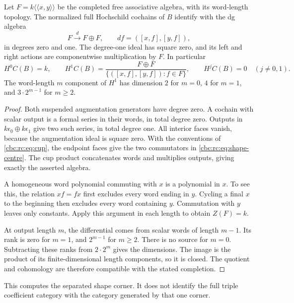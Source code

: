 \begin{theorem}\label{cbc:rc:thm:shape-centre}
Let \(F=k\langle\!\langle x,y\rangle\!\rangle\) be the completed free
associative algebra, with its word-length topology.
The normalized full Hochschild cochains of \(B\) identify with the dg
algebra
\begin{equation}\label{cbc:rc:eq:shape-centre}
 F\xrightarrow{d}F\oplus F,\qquad
 df=([x,f],[y,f]),
\end{equation}
in degrees zero and one.  The degree-one ideal has square zero, and
its left and right actions are componentwise multiplication by \(F\).
In particular
\[
 H^0C(B)=k,\qquad
 H^1C(B)=\frac{F\oplus F}
 {\{([x,f],[y,f]):f\in F\}},
 \qquad H^jC(B)=0\quad(j\ne0,1).
\]
The word-length \(m\) component of \(H^1\) has dimension
\(2\) for \(m=0\), \(4\) for \(m=1\), and
\(3\cdot2^{m-1}\) for \(m\geq2\).
\end{theorem}
\begin{proof}
Both suspended augmentation generators have degree zero.  A cochain
with scalar output is a formal series in their words, in total degree
zero.  Outputs in \(k\epsilon_0\oplus k\epsilon_1\) give two such
series, in total degree one.  All interior faces vanish, because the
augmentation ideal is square zero.  With the conventions of
\eqref{cbc:rc:eq:cup}, the endpoint faces give the two commutators in
\eqref{cbc:rc:eq:shape-centre}.  The cup product concatenates words and
multiplies outputs, giving exactly the asserted algebra.

A homogeneous word polynomial commuting with \(x\) is a polynomial
in \(x\).  To see this, the relation \(xf=fx\) first excludes every
word ending in \(y\). Cycling a final \(x\) to the beginning then
excludes every word containing \(y\).
Commutation with \(y\) leaves only constants.
Apply this argument in each length to obtain \(Z(F)=k\).

At output length \(m\), the differential comes from scalar words of
length \(m-1\).  Its rank is zero for \(m=1\), and
\(2^{m-1}\) for \(m\geq2\). There is no source for \(m=0\).
Subtracting these ranks from \(2\cdot2^m\) gives the dimensions.
The image is the product of its finite-dimensional length components,
so it is closed.  The quotient and cohomology are therefore compatible
with the stated completion.
\end{proof}

This computes the separated shape corner.  It does not identify the
full triple coefficient category with the category generated by that
one corner.

